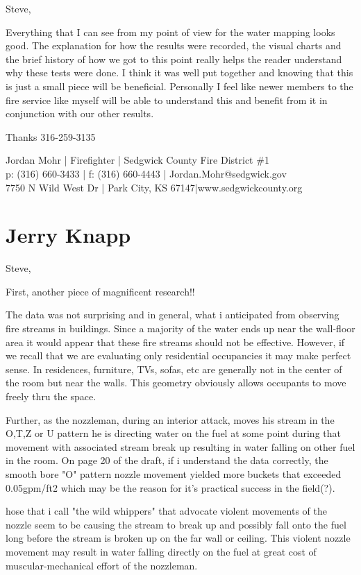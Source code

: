 \documentclass[12pt,oneside]{book}
\begin{document}
\begin{appendix}
Steve,
 
Everything that I can see from my point of view for the water mapping looks good. The explanation for how the results were recorded, the visual charts and the brief history of how we got to this point really helps the reader understand why these tests were done. I think it was well put together and knowing that this is just a small piece will be beneficial. Personally I feel like newer members to the fire service like myself will be able to understand this and benefit from it in conjunction with our other results.
 
Thanks
316-259-3135
 
Jordan Mohr | Firefighter | Sedgwick County Fire District \#1 \\
p: (316) 660-3433 | f: (316) 660-4443 | Jordan.Mohr@sedgwick.gov \\
7750 N Wild West Dr | Park City, KS 67147|www.sedgwickcounty.org \\

\section{Jerry Knapp}

Steve,
 
First, another piece of magnificent research!!  
 
The data was not surprising and in general, what i anticipated from observing fire streams in buildings. Since a majority of the water ends up near the wall-floor area it would appear that these fire streams should not be effective.  However, if we recall that we are evaluating only residential occupancies it may make perfect sense.  In residences, furniture, TVs, sofas, etc are generally not in the center of the room but near the walls.  This geometry obviously allows occupants to move freely thru the space.  
 
Further, as the nozzleman, during an interior attack, moves his stream in the O,T,Z or U pattern he is directing water on the fuel at some point during that movement with associated stream break up resulting in water falling on other fuel in the room.  On page 20 of the draft, if i understand the data correctly, the smooth bore "O" pattern nozzle movement yielded more buckets that exceeded 0.05gpm/ft2 which may be the reason for it's practical success in the field(?).
 
 hose that i call "the wild whippers" that advocate violent movements of the nozzle seem to be causing the stream to break up and possibly fall onto the fuel long before the stream is broken up on the far wall or ceiling.  This violent nozzle movement may result in water falling directly on the fuel at great cost of muscular-mechanical effort of the nozzleman.
 

\end{appendix}
\end{document}
